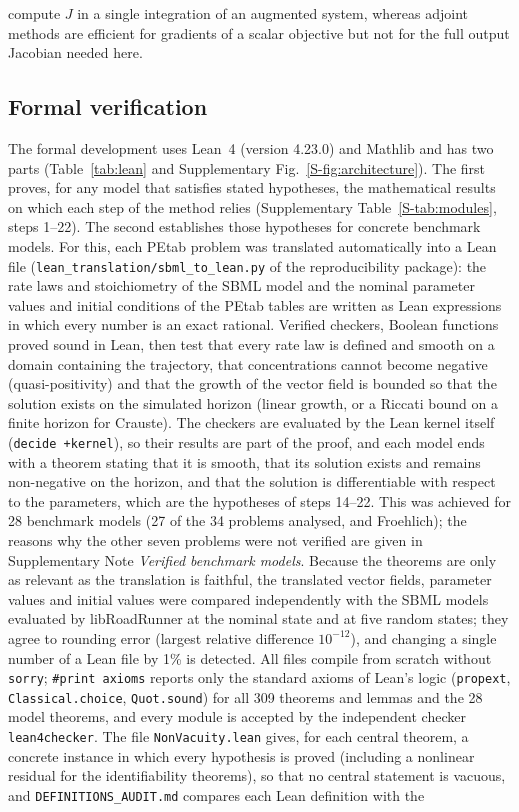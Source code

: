 \documentclass[pdflatex,sn-nature]{sn-jnl}
\theoremstyle{plain}
\begin{document}
compute $J$ in a single integration of an augmented system, whereas adjoint methods are efficient for gradients of a scalar objective but not for the full output Jacobian needed here.

\subsection*{Formal verification}\label{met:formal}

The formal development uses Lean~4 (version 4.23.0) and Mathlib\cite{bib19,bib21} and has two parts (Table~\ref{tab:lean} and Supplementary Fig.~\ref{S-fig:architecture}). The first proves, for any model that satisfies stated hypotheses, the mathematical results on which each step of the method relies (Supplementary Table~\ref{S-tab:modules}, steps 1--22). The second establishes those hypotheses for concrete benchmark models. For this, each PEtab problem was translated automatically into a Lean file (\texttt{lean\_translation/sbml\_to\_lean.py} of the reproducibility package): the rate laws and stoichiometry of the SBML model and the nominal parameter values and initial conditions of the PEtab tables are written as Lean expressions in which every number is an exact rational. Verified checkers, Boolean functions proved sound in Lean, then test that every rate law is defined and smooth on a domain containing the trajectory, that concentrations cannot become negative (quasi-positivity) and that the growth of the vector field is bounded so that the solution exists on the simulated horizon (linear growth, or a Riccati bound on a finite horizon for Crauste). The checkers are evaluated by the Lean kernel itself (\texttt{decide +kernel}), so their results are part of the proof, and each model ends with a theorem stating that it is smooth, that its solution exists and remains non-negative on the horizon, and that the solution is differentiable with respect to the parameters, which are the hypotheses of steps 14--22. This was achieved for 28 benchmark models (27 of the 34 problems analysed, and Froehlich); the reasons why the other seven problems were not verified are given in Supplementary Note \textit{Verified benchmark models}. Because the theorems are only as relevant as the translation is faithful, the translated vector fields, parameter values and initial values were compared independently with the SBML models evaluated by libRoadRunner at the nominal state and at five random states; they agree to rounding error (largest relative difference $10^{-12}$), and changing a single number of a Lean file by 1\% is detected. All files compile from scratch without \texttt{sorry}; \texttt{\#print axioms} reports only the standard axioms of Lean's logic (\texttt{propext}, \texttt{Classical.choice}, \texttt{Quot.sound}) for all 309 theorems and lemmas and the 28 model theorems, and every module is accepted by the independent checker \texttt{lean4checker}. The file \texttt{NonVacuity.lean} gives, for each central theorem, a concrete instance in which every hypothesis is proved (including a nonlinear residual for the identifiability theorems), so that no central statement is vacuous, and \texttt{DEFINITIONS\_AUDIT.md} compares each Lean definition with the 
\end{document}

